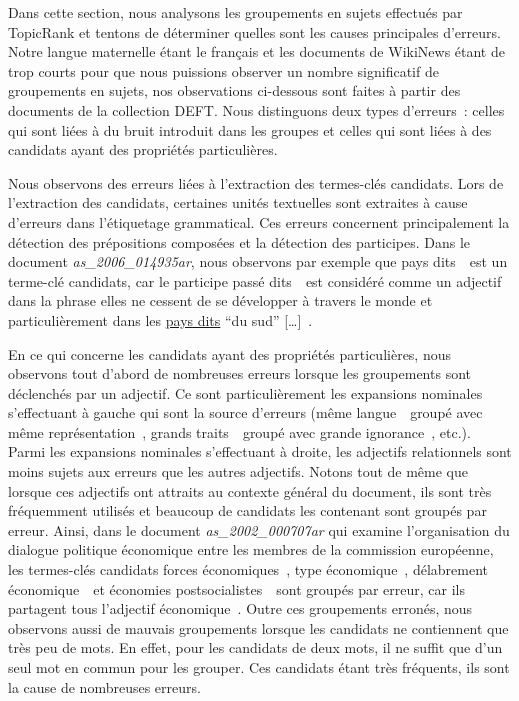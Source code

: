     Dans cette section, nous analysons les groupements en sujets effectués par
    TopicRank et tentons de déterminer quelles sont les causes principales
    d'erreurs. Notre langue maternelle étant le français et les documents de
    WikiNews étant de trop courts pour que nous puissions observer un nombre
    significatif de groupements en sujets, nos observations ci-dessous sont
    faites à partir des documents de la collection DEFT. Nous distinguons deux
    types d'erreurs~: celles qui sont liées à du bruit introduit dans les
    groupes et celles qui sont liées à des candidats ayant des propriétés
    particulières.

    Nous observons des erreurs liées à l'extraction des termes-clés candidats.
    Lors de l'extraction des candidats, certaines unités textuelles sont
    extraites à cause d'erreurs dans l'étiquetage grammatical. Ces erreurs
    concernent principalement la détection des prépositions composées et la
    détection des participes. Dans le document \textit{as\_2006\_014935ar}, nous
    observons par exemple que \og pays dits~\fg\ est un terme-clé candidats, car
    le participe passé \og dits~\fg\ est considéré comme un adjectif dans la
    phrase \og [\dots] elles ne cessent de se développer à travers le monde et
    particulièrement dans les \underline{pays dits} ``du sud'' [\dots]~\fg.

    En ce qui concerne les candidats ayant des propriétés particulières, nous
    observons tout d'abord de nombreuses erreurs lorsque les groupements sont
    déclenchés par un adjectif. Ce sont particulièrement les expansions
    nominales s'effectuant à gauche qui sont la source d'erreurs (\og même
    langue~\fg\ groupé avec \og même représentation~\fg, \og grands
    traits~\fg\ groupé avec \og grande ignorance~\fg, etc.). Parmi les
    expansions nominales s'effectuant à droite, les adjectifs relationnels sont
    moins sujets aux erreurs que les autres adjectifs. Notons tout de même que
    lorsque ces adjectifs ont attraits au contexte général du document, ils sont
    très fréquemment utilisés et beaucoup de candidats les contenant sont
    groupés par erreur. Ainsi, dans le document \textit{as\_2002\_000707ar} qui
    examine l'organisation du dialogue politique économique entre les membres de
    la commission européenne, les termes-clés candidats \og forces
    économiques~\fg, \og type économique~\fg, \og délabrement économique~\fg\ et
    \og économies postsocialistes~\fg\ sont groupés par erreur, car ils
    partagent tous l'adjectif \og économique~\fg. Outre ces groupements erronés,
    nous observons aussi de mauvais groupements lorsque les candidats ne
    contiennent que très peu de mots. En effet, pour les candidats de deux mots,
    il ne suffit que d'un seul mot en commun pour les grouper. Ces candidats
    étant très fréquents, ils sont la cause de nombreuses erreurs.

